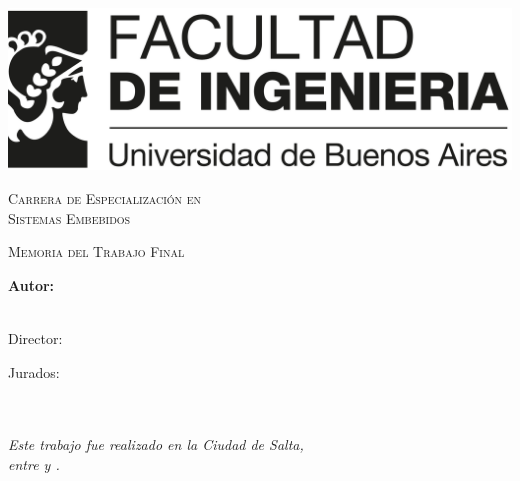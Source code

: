 \documentclass[
11pt, %
spanish,
singlespacing, %
parskip, %
headsepline, %
]{MastersDoctoralThesis} %
\author{Ing. Mauricio Barroso Benavides} %
\begin{document}
\frontmatter %

\pagestyle{plain} %


\begin{titlepage}
\begin{center}


\includegraphics[width=.8\textwidth]{./Figures/logoFIUBA.png}
\vspace{2cm}

\textsc{\huge{Carrera de Especialización en\\ \vspace{5px} Sistemas Embebidos}}
\vspace{.5cm} %

\textsc{\Large Memoria del Trabajo Final}\\[1cm] %
{\huge \bfseries \ttitle\par}\vspace{0.4cm} %

\vfill

\vspace{2cm}
\LARGE\textbf{Autor:\\
\authorname}\\ %

\vspace{1.5cm}

\large
{Director:} \\
{\supname} %
 
\vspace{1cm}
Jurados:\\	
\jurunoname\\
\jurdosname\\
\jurtresname

\vspace{1cm}

\textit{Este trabajo fue realizado en la Ciudad de Salta,\\ entre \fechaINICIOname \hspace{1px} y \fechaFINALname.}
\end{center}
\end{titlepage}
\end{document}
